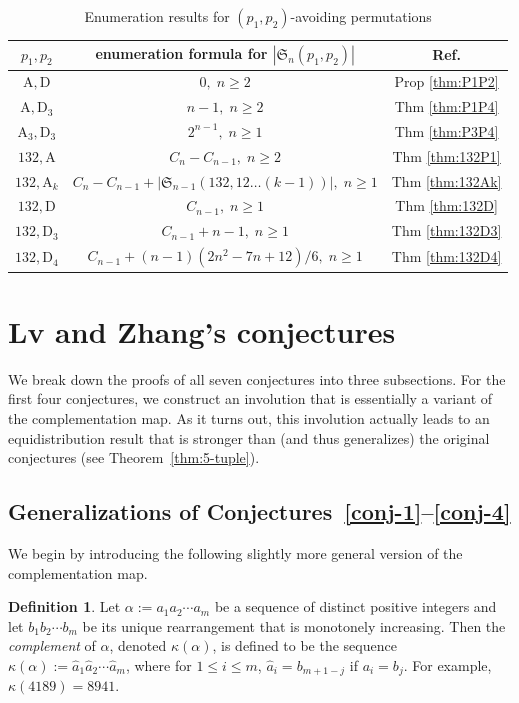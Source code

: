 \documentclass[12pt,reqno]{article}
\numberwithin{equation}{section}
\theoremstyle{plain}
\theoremstyle{definition}
\newtheorem{Def}[theorem]{Definition}
\def\fS{\mathfrak{S}}
\def\rA{\mathrm{A}}
\def\rD{\mathrm{D}}
\begin{document}
\begin{table}[ht!]
	\renewcommand{\arraystretch}{1.6}
	\centering
	\begin{tabular}{|c||c||c|}
		\hline
		$p_1,p_2$ & enumeration formula for $|\fS_n(p_1,p_2)|$ & Ref.\\
		\hline
		\hline
		$\rA,\rD$ & $0 ,\; n\geq 2$ & Prop \ref{thm:P1P2} \\
		\hline 
		$\rA,\rD_3$ & $n-1 ,\; n\geq 2$ & Thm \ref{thm:P1P4} \\
		\hline 
		$\rA_3,\rD_3$ & $2^{n-1} ,\; n\geq 1$ & Thm \ref{thm:P3P4} \\
		\hline 
		$132,\rA$ & $C_{n}-C_{n-1} ,\; n\geq 2$ & Thm \ref{thm:132P1} \\
		\hline 
		
		
		$132,\rA_k$ & $C_{n}-C_{n-1}+|\fS_{n-1}(132,12\ldots(k-1))|,\; n\geq 1$ & Thm \ref{thm:132Ak} \\
		\hline 
		$132,\rD$ & $C_{n-1} ,\; n\geq 1$ & Thm \ref{thm:132D} \\
		\hline 
		$132,\rD_3$ & $C_{n-1}+n-1,\; n\geq 1$ & Thm \ref{thm:132D3} \\
		\hline 
		$132,\rD_4$ & $C_{n-1}+(n-1)(2n^2-7n+12)/6,\; n\geq 1$ & Thm \ref{thm:132D4} \\
		\hline 
	\end{tabular}
	\medskip
	\caption{Enumeration results for $(p_1,p_2)$-avoiding permutations}
	\label{tab:Enum}
\end{table}



\section{Lv and Zhang's conjectures}\label{sec:conj}


We break down the proofs of all seven conjectures into three subsections. For the first four conjectures, we construct an involution that is essentially a variant of the complementation map. As it turns out, this involution actually leads to an equidistribution result that is stronger than (and thus generalizes) the original conjectures (see Theorem~\ref{thm:5-tuple}).

\subsection{Generalizations of Conjectures~\ref{conj-1}--\ref{conj-4}}
We begin by introducing the following slightly more general version of the complementation map.
\begin{Def}\label{def:comp}
	Let $\alpha:=a_1a_2\cdots a_m$ be a sequence of distinct positive integers and let $b_1b_2\cdots b_m$ be its unique rearrangement that is monotonely increasing. Then the {\it complement} of $\alpha$, denoted $\kappa(\alpha)$, is defined to be the sequence $\kappa(\alpha):=\hat{a}_1\hat{a}_2\cdots\hat{a}_m$, where for $1\le i\le m$, $\hat{a}_i=b_{m+1-j}$ if $a_i=b_j$. For example, $\kappa(4189)=8941$.
\end{Def}
\end{document}
